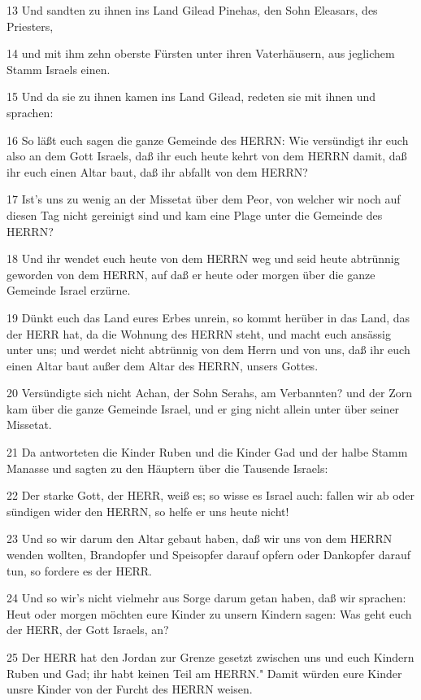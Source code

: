 \par 13 Und sandten zu ihnen ins Land Gilead Pinehas, den Sohn Eleasars, des Priesters,
\par 14 und mit ihm zehn oberste Fürsten unter ihren Vaterhäusern, aus jeglichem Stamm Israels einen.
\par 15 Und da sie zu ihnen kamen ins Land Gilead, redeten sie mit ihnen und sprachen:
\par 16 So läßt euch sagen die ganze Gemeinde des HERRN: Wie versündigt ihr euch also an dem Gott Israels, daß ihr euch heute kehrt von dem HERRN damit, daß ihr euch einen Altar baut, daß ihr abfallt von dem HERRN?
\par 17 Ist's uns zu wenig an der Missetat über dem Peor, von welcher wir noch auf diesen Tag nicht gereinigt sind und kam eine Plage unter die Gemeinde des HERRN?
\par 18 Und ihr wendet euch heute von dem HERRN weg und seid heute abtrünnig geworden von dem HERRN, auf daß er heute oder morgen über die ganze Gemeinde Israel erzürne.
\par 19 Dünkt euch das Land eures Erbes unrein, so kommt herüber in das Land, das der HERR hat, da die Wohnung des HERRN steht, und macht euch ansässig unter uns; und werdet nicht abtrünnig von dem Herrn und von uns, daß ihr euch einen Altar baut außer dem Altar des HERRN, unsers Gottes.
\par 20 Versündigte sich nicht Achan, der Sohn Serahs, am Verbannten? und der Zorn kam über die ganze Gemeinde Israel, und er ging nicht allein unter über seiner Missetat.
\par 21 Da antworteten die Kinder Ruben und die Kinder Gad und der halbe Stamm Manasse und sagten zu den Häuptern über die Tausende Israels:
\par 22 Der starke Gott, der HERR, weiß es; so wisse es Israel auch: fallen wir ab oder sündigen wider den HERRN, so helfe er uns heute nicht!
\par 23 Und so wir darum den Altar gebaut haben, daß wir uns von dem HERRN wenden wollten, Brandopfer und Speisopfer darauf opfern oder Dankopfer darauf tun, so fordere es der HERR.
\par 24 Und so wir's nicht vielmehr aus Sorge darum getan haben, daß wir sprachen: Heut oder morgen möchten eure Kinder zu unsern Kindern sagen: Was geht euch der HERR, der Gott Israels, an?
\par 25 Der HERR hat den Jordan zur Grenze gesetzt zwischen uns und euch Kindern Ruben und Gad; ihr habt keinen Teil am HERRN." Damit würden eure Kinder unsre Kinder von der Furcht des HERRN weisen.
